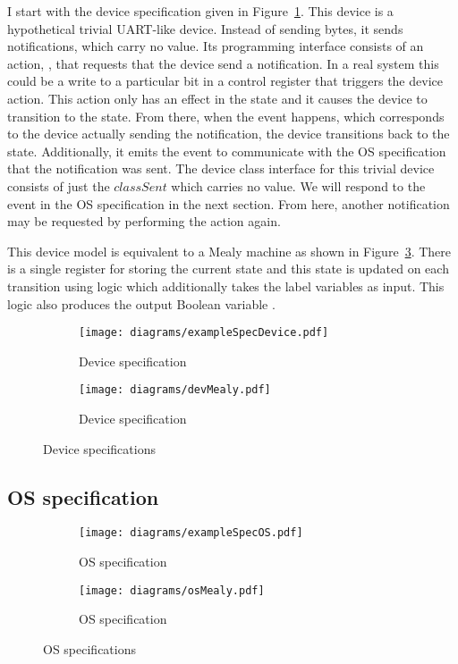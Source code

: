 I start with the device specification given in Figure~\ref{fig:dev_spec}. This device is a hypothetical trivial UART-like device. Instead of sending bytes, it sends notifications, which carry no value. Its programming interface consists of an action, , that requests that the device send a notification. In a real system this could be a write to a particular bit in a control register that triggers the device action. This action only has an effect in the  state and it causes the device to transition to the  state. From there, when the  event happens, which corresponds to the device actually sending the notification, the device transitions back to the  state. Additionally, it emits the  event to communicate with the OS specification that the notification was sent. The device class interface for this trivial device consists of just the $classSent$ which carries no value. We will respond to the  event in the OS specification in the next section. From here, another notification may be requested by performing the  action again.

This device model is equivalent to a Mealy machine as shown in Figure~\ref{fig:dev_spec_mealy}. There is a single register for storing the current state and this state is updated on each transition using logic which additionally takes the label variables as input. This logic also produces the output Boolean variable .

\begin{figure}
\centering
\begin{subfigure}[t]{0.47\textwidth}
\texttt{[image: diagrams/exampleSpecDevice.pdf]}
\caption{Device specification}
\label{fig:dev_spec}
\end{subfigure}
\hfill
\begin{subfigure}[t]{0.47\textwidth}
\texttt{[image: diagrams/devMealy.pdf]}
\caption{Device specification}
\label{fig:dev_spec_mealy}
\end{subfigure}
\caption{Device specifications}
\end{figure}

\subsection{OS specification}

\begin{figure}
\centering
\begin{subfigure}[t]{0.47\textwidth}
\texttt{[image: diagrams/exampleSpecOS.pdf]}
\caption{OS specification}
\label{fig:os_spec}
\end{subfigure}
\hfill
\begin{subfigure}[t]{0.47\textwidth}
\centering
\texttt{[image: diagrams/osMealy.pdf]}
\caption{OS specification}
\label{fig:os_spec_mealy}
\end{subfigure}
\caption{OS specifications}
\end{figure}

